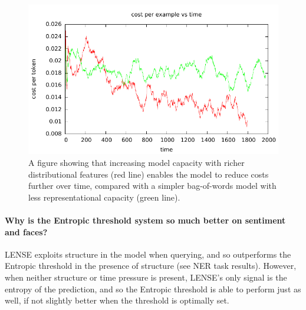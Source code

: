 \begin{figure}[t]
  \begin{centering}
  \includegraphics[width=1.0\textwidth]{figures/sentiment_cost_per_token_vs_time/cost_per_token_vs_time.pdf}
  \end{centering}
  \caption{A figure showing that increasing model capacity with richer distributional features (red line) enables the model to reduce costs further over time, compared with a simpler bag-of-words model with less representational capacity (green line).}
\label{fig:sentiment-tradeoff}
\end{figure}

\paragraph{Why is the Entropic threshold system so much better on sentiment and faces?}
LENSE exploits structure in the model when querying, and so outperforms the Entropic threshold in the presence of structure (see NER task results).
However, when neither structure or time pressure is present, LENSE's only signal is the entropy of the prediction, and so the Entropic threshold is able to perform just as well, if not slightly better when the threshold is optimally set.
